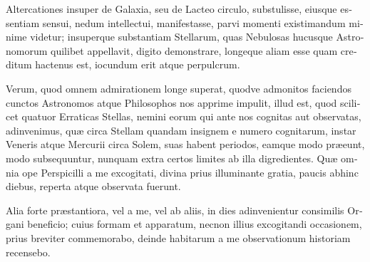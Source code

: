\documentclass[11pt,twoside,openany]{book}
\begin{document}
\begin{otherlanguage}{latin}
Altercationes insuper de Galaxia, seu de Lacteo circulo, substulisse, eiusque essentiam sensui, nedum intellectui, manifestasse, parvi momenti existimandum minime videtur; insuperque substantiam Stellarum, quas Nebulosas hucusque Astronomorum quilibet appellavit, digito demonstrare, longeque aliam esse quam creditum hactenus est, iocundum erit atque perpulcrum.

Verum, quod omnem admirationem longe superat, quodve admonitos faciendos cunctos Astronomos atque Philosophos nos apprime impulit, illud est, quod scilicet quatuor Erraticas Stellas, nemini eorum qui ante nos cognitas aut observatas, adinvenimus, quæ circa Stellam quandam insignem e numero cognitarum, instar Veneris atque Mercurii circa Solem, suas habent periodos, eamque modo præeunt, modo subsequuntur, nunquam extra certos limites ab illa digredientes. Quæ omnia ope Perspicilli a me excogitati, divina prius illuminante gratia, paucis abhinc diebus, reperta atque observata fuerunt.

Alia forte præstantiora, vel a me, vel ab aliis, in dies adinvenientur consimilis Organi beneficio; cuius formam et apparatum, necnon illius excogitandi occasionem, prius breviter commemorabo, deinde habitarum a me observationum historiam recensebo.


\end{otherlanguage}
\end{document}
